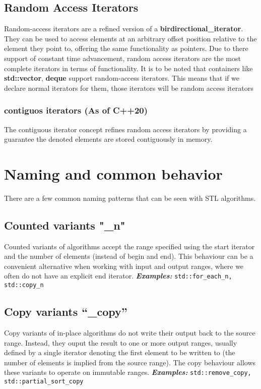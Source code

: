 \documentclass{report}
\begin{document}
\subsection*{Random Access Iterators}
Random-access iterators are  a refined version of a \textbf{birdirectional\_iterator}. They can be used to access elements at an arbitrary offset position relative to the element they point to, offering the same functionality as pointers. 
  \bigbreak \noindent
  Due to there support of constant time advancement, random access iterators are the most complete iterators in terms of functionality. 
  \bigbreak \noindent
  It is to be noted that containers like \textbf{std::vector}, \textbf{deque} support random-access iterators. This means that if we declare normal iterators for them, those iterators will be random access iterators
  \subsubsection*{contiguos iterators (As of C++20)}
  The contiguous iterator concept refines random access iterators by providing a guarantee the denoted elements are stored contiguously in memory.
  
\section{Naming and common behavior} 
There are a few common naming patterns that can be seen with STL algorithms.
\subsection{Counted variants "\_n"}
Counted variants of algorithms accept the range specified using the start iterator and the number of elements (instead of begin and end). This behaviour can be a convenient alternative when working with input and output ranges, where we often do not have an explicit end iterator.
\bigbreak \noindent
\textbf{\textit{Examples:}} \texttt{std::for\_each\_n, std::copy\_n}
\subsection{Copy variants ``\_copy''}
Copy variants of in-place algorithms do not write their output back to the source range. Instead, they ouput the result to one or more output ranges, usually defined by a single iterator denoting the first element to be written to (the number of elements is implied from the source range). The copy behaviour allows these variants to operate on immutable ranges.
\bigbreak\noindent
\textbf{\textit{Examples:}} \texttt{std::remove\_copy, std::partial\_sort\_copy}
\end{document}
